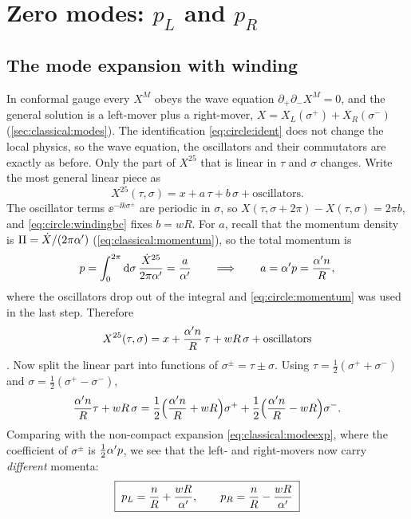 \section{Zero modes: \texorpdfstring{$p_L$}{pL} and \texorpdfstring{$p_R$}{pR}}
\label{sec:circle:zeromodes}

\subsection{The mode expansion with winding}

In conformal gauge every $X^M$ obeys the wave equation
$\partial_+\partial_-X^M=0$, and the general solution is a left-mover plus a right-mover,
$X=X_L(\sigma^+)+X_R(\sigma^-)$ (\cref{sec:classical:modes}). The identification
\eqref{eq:circle:ident} does not change the local physics, so the wave equation, the
oscillators and their commutators are exactly as before. Only the part of $X^{25}$ that is
linear in $\tau$ and $\sigma$ changes. Write the most general linear piece as
\[
 X^{25}(\tau,\sigma)=x+a\,\tau+b\,\sigma+\text{oscillators} .
\]
The oscillator terms $\ee^{-\ii k\sigma^\pm}$ are periodic in $\sigma$, so
$X(\tau,\sigma+2\pi)-X(\tau,\sigma)=2\pi b$, and \eqref{eq:circle:windingbc} fixes $b=wR$. For
$a$, recall that the momentum density is $\Pi=\dot X/(2\pi\alpha')$ (\cref{eq:classical:momentum}), so the
total momentum is
\[
 p=\int_0^{2\pi}\mathrm{d}\sigma\,\frac{\dot X^{25}}{2\pi\alpha'}=\frac{a}{\alpha'}
 \qquad\Longrightarrow\qquad a=\alpha' p=\frac{\alpha' n}{R},
\]
where the oscillators drop out of the integral and \eqref{eq:circle:momentum} was used in the
last step. Therefore
\begin{equation}\label{eq:circle:zeromode}
 X^{25}(\tau,\sigma)=x+\frac{\alpha' n}{R}\,\tau+wR\,\sigma+\text{oscillators}
\end{equation}
. Now split the linear part into
functions of $\sigma^\pm=\tau\pm\sigma$. Using $\tau=\frac12(\sigma^++\sigma^-)$ and
$\sigma=\frac12(\sigma^+-\sigma^-)$,
\[
 \frac{\alpha' n}{R}\tau+wR\,\sigma
 =\frac12\Big(\frac{\alpha' n}{R}+wR\Big)\sigma^+
 +\frac12\Big(\frac{\alpha' n}{R}-wR\Big)\sigma^- .
\]
Comparing with the non-compact expansion \cref{eq:classical:modeexp}, where the coefficient of
$\sigma^\pm$ is $\frac12\alpha' p$, we see that the left- and right-movers now carry
\emph{different} momenta:
\begin{equation}\label{eq:circle:pLpR}
 \boxed{\;p_L=\frac nR+\frac{wR}{\alpha'},\qquad p_R=\frac nR-\frac{wR}{\alpha'}\;}
\end{equation}

